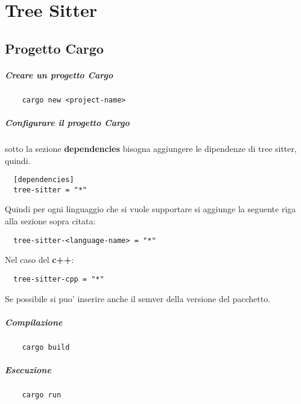 \chapter{Tree Sitter}

\section{Progetto Cargo}

\paragraph{Creare un progetto Cargo}

\begin{verbatim}
	cargo new <project-name>
\end{verbatim}

\paragraph{Configurare il progetto Cargo}

sotto la sezione \textbf{dependencies} bisogna aggiungere le dipendenze di tree sitter, quindi.

\begin{verbatim}
  [dependencies]
  tree-sitter = "*"
\end{verbatim}

Quindi per ogni linguaggio che si vuole supportare si aggiunge la seguente riga alla sezione sopra citata:

\begin{verbatim}
  tree-sitter-<language-name> = "*"
\end{verbatim}

Nel caso del \textbf{c++}:

\begin{verbatim}
  tree-sitter-cpp = "*"
\end{verbatim}

Se possibile si puo' inserire anche il semver della versione del pacchetto.

\paragraph{Compilazione}

\begin{verbatim}
	cargo build
\end{verbatim}

\paragraph{Esecuzione}

\begin{verbatim}
	cargo run
\end{verbatim}


